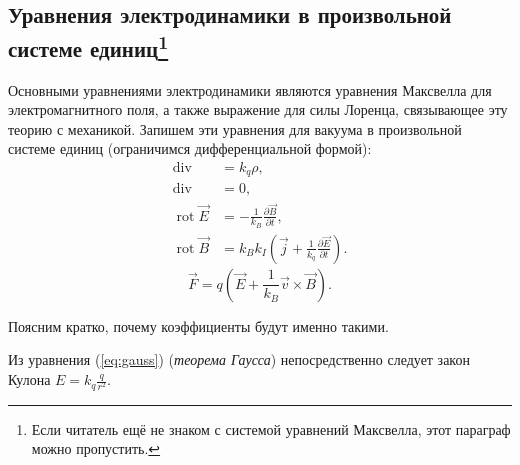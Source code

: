 \subsection*{Уравнения электродинамики в произвольной системе единиц\protect\footnote{Если читатель ещё не знаком с системой уравнений Максвелла, этот параграф
можно пропустить.}}

Основными уравнениями электродинамики являются уравнения Максвелла
для электромагнитного поля, а также выражение для силы Лоренца, связывающее
эту теорию с механикой. Запишем эти уравнения для вакуума в произвольной
системе единиц (ограничимся дифференциальной формой):
\begin{align}
\mathop{\mathrm{div}\vec{E}} & =k_{q}\rho,\label{eq:gauss}\\
\mathop{\mathrm{div}\vec{B}} & =0,\\
\mathop{\mathrm{rot}}\vec{E} & =-\frac{1}{k_{B}}\frac{\partial\vec{B}}{\partial t},\label{eq:faradey}\\
\mathop{\mathrm{rot}}\vec{B} & =k_{B}k_{I}\left(\vec{j}+\frac{1}{k_{q}}\frac{\partial\vec{E}}{\partial t}\right).\label{eq:ampere-dif}
\end{align}
\begin{equation}
\vec{F}=q\left(\vec{E}+\frac{1}{k_{B}}\vec{v}\times\vec{B}\right).\label{eq:lorentz}
\end{equation}

Поясним кратко, почему коэффициенты будут именно такими.

Из уравнения (\ref{eq:gauss}) (\emph{теорема Гаусса}) непосредственно
следует закон Кулона $E=k_{q}\frac{q}{r^{2}}$.

